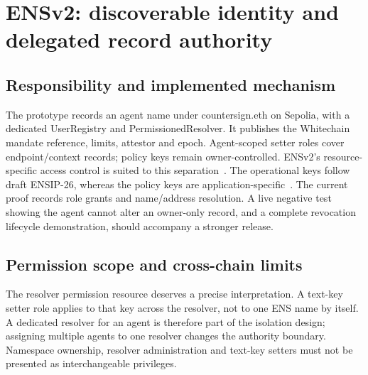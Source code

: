 \documentclass[11pt]{article}
\begin{document}


\section{ENSv2: discoverable identity and delegated record authority}
\subsection{Responsibility and implemented mechanism}
The prototype records an agent name under countersign.eth on Sepolia, with a dedicated UserRegistry and PermissionedResolver. It publishes the Whitechain mandate reference, limits, attestor and epoch. Agent-scoped setter roles cover endpoint/context records; policy keys remain owner-controlled. ENSv2's resource-specific access control is suited to this separation~\cite{ens,ensregistry,ensresolver}. The operational keys follow draft ENSIP-26, whereas the policy keys are application-specific~\cite{ensip26}. The current proof records role grants and name/address resolution. A live negative test showing the agent cannot alter an owner-only record, and a complete revocation lifecycle demonstration, should accompany a stronger release.

\subsection{Permission scope and cross-chain limits}
The resolver permission resource deserves a precise interpretation. A text-key setter role applies to that key across the resolver, not to one ENS name by itself. A dedicated resolver for an agent is therefore part of the isolation design; assigning multiple agents to one resolver changes the authority boundary. Namespace ownership, resolver administration and text-key setters must not be presented as interchangeable privileges.
\end{document}
